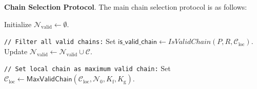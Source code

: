 \bigbreak
\bigbreak
\noindent
{}
\textbf{Chain Selection Protocol}.\label{apndx:max-selection-protocol}
The main chain selection protocol is as follows:
\begin{protocol}
    \caption{$\textsf{SelectChain}(P, R, K_{\text{f}}, K_{\text{g}}, \mathcal{C}_{\text{loc}}, \mathcal{N}_0)$}
    \begin{algorithmic}[1]
        \State Initialize $\mathcal{N}_{\text{valid}} \leftarrow \emptyset$.

        \noindent
        \lstinline|// Filter all valid chains:|
            \State Set $\textsf{is\_valid\_chain} \leftarrow IsValidChain(P, R, \mathcal{C}_{\text{loc}})$.
                \State Update $\mathcal{N}_{\text{valid}} \leftarrow \mathcal{N}_{\text{valid}} \cup \mathcal{C}$.
            \EndIf
        \EndFor

        \noindent
        \lstinline|// Set local chain as maximum valid chain:|
        \State Set $\mathcal{C}_{\text{loc}} \leftarrow \textsf{MaxValidChain}(\mathcal{C}_{\text{loc}}, \mathcal{N}_0, K_{\text{f}}, K_{\text{g}})$.

    \end{algorithmic}\label{alg:max-selection-protocol}
\end{protocol}
